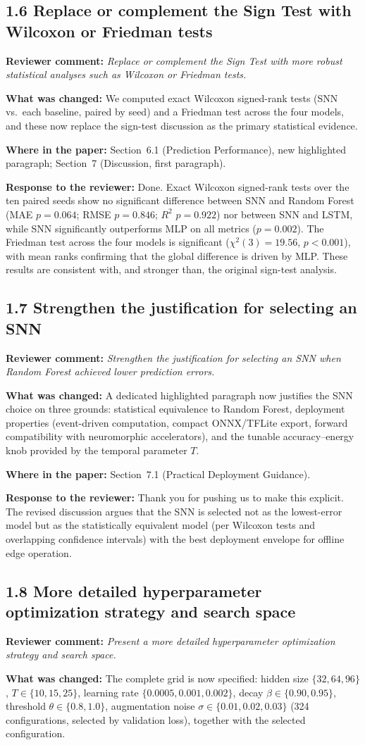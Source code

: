 \documentclass[11pt,a4paper]{article}
\newcommand{\comment}[1]{\textbf{Reviewer comment:} \textit{#1}}
\newcommand{\change}[1]{\textbf{What was changed:} #1}
\newcommand{\where}[1]{\textbf{Where in the paper:} #1}
\newcommand{\resp}[1]{\textbf{Response to the reviewer:} \textcolor{revblue}{#1}}
\newcommand{\pt}[1]{\subsection*{#1}}
\begin{document}
\pt{1.6 Replace or complement the Sign Test with Wilcoxon or Friedman tests}
\comment{Replace or complement the Sign Test with more robust statistical analyses such as Wilcoxon or Friedman tests.}

\change{We computed exact Wilcoxon signed-rank tests (SNN vs.\ each baseline, paired by seed) and a Friedman test across the four models, and these now replace the sign-test discussion as the primary statistical evidence.}

\where{Section~6.1 (Prediction Performance), new highlighted paragraph; Section~7 (Discussion, first paragraph).}

\resp{Done. Exact Wilcoxon signed-rank tests over the ten paired seeds show no significant difference between SNN and Random Forest (MAE $p=0.064$; RMSE $p=0.846$; $R^2$ $p=0.922$) nor between SNN and LSTM, while SNN significantly outperforms MLP on all metrics ($p=0.002$). The Friedman test across the four models is significant ($\chi^2(3)=19.56$, $p<0.001$), with mean ranks confirming that the global difference is driven by MLP. These results are consistent with, and stronger than, the original sign-test analysis.}

\pt{1.7 Strengthen the justification for selecting an SNN}
\comment{Strengthen the justification for selecting an SNN when Random Forest achieved lower prediction errors.}

\change{A dedicated highlighted paragraph now justifies the SNN choice on three grounds: statistical equivalence to Random Forest, deployment properties (event-driven computation, compact ONNX/TFLite export, forward compatibility with neuromorphic accelerators), and the tunable accuracy--energy knob provided by the temporal parameter $T$.}

\where{Section~7.1 (Practical Deployment Guidance).}

\resp{Thank you for pushing us to make this explicit. The revised discussion argues that the SNN is selected not as the lowest-error model but as the statistically equivalent model (per Wilcoxon tests and overlapping confidence intervals) with the best deployment envelope for offline edge operation.}

\pt{1.8 More detailed hyperparameter optimization strategy and search space}
\comment{Present a more detailed hyperparameter optimization strategy and search space.}

\change{The complete grid is now specified: hidden size $\{32, 64, 96\}$, $T \in \{10, 15, 25\}$, learning rate $\{0.0005, 0.001, 0.002\}$, decay $\beta \in \{0.90, 0.95\}$, threshold $\theta \in \{0.8, 1.0\}$, augmentation noise $\sigma \in \{0.01, 0.02, 0.03\}$ (324 configurations, selected by validation loss), together with the selected configuration.}
\end{document}
